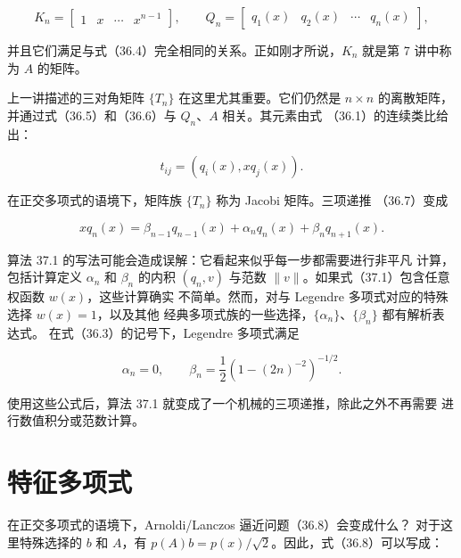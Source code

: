 \documentclass[UTF8,fontset=none,12pt]{ctexart}
\begin{document}
\begin{equation}
K_n=\begin{bmatrix}1&x&\cdots&x^{n-1}\end{bmatrix},
\qquad
Q_n=\begin{bmatrix}q_1(x)&q_2(x)&\cdots&q_n(x)\end{bmatrix},
\tag{37.3}
\end{equation}

并且它们满足与式（36.4）完全相同的关系。正如刚才所说，$K_n$ 就是第 7
讲中称为 $A$ 的矩阵。

上一讲描述的三对角矩阵 $\{T_n\}$ 在这里尤其重要。它们仍然是 $n\times n$
的离散矩阵，并通过式（36.5）和（36.6）与 $Q_n$、$A$ 相关。其元素由式
（36.1）的连续类比给出：

\begin{equation}
t_{ij}=(q_i(x),xq_j(x)).
\tag{37.4}
\end{equation}

在正交多项式的语境下，矩阵族 $\{T_n\}$ 称为 Jacobi 矩阵。三项递推
（36.7）变成

\begin{equation}
xq_n(x)=\beta_{n-1}q_{n-1}(x)+\alpha_nq_n(x)+\beta_nq_{n+1}(x).
\tag{37.5}
\end{equation}

算法 37.1 的写法可能会造成误解：它看起来似乎每一步都需要进行非平凡
计算，包括计算定义 $\alpha_n$ 和 $\beta_n$ 的内积 $(q_n,v)$ 与范数
$\lVert v\rVert$。如果式（37.1）包含任意权函数 $w(x)$，这些计算确实
不简单。然而，对与 Legendre 多项式对应的特殊选择 $w(x)=1$，以及其他
经典多项式族的一些选择，$\{\alpha_n\}$、$\{\beta_n\}$ 都有解析表达式。
在式（36.3）的记号下，Legendre 多项式满足

\begin{equation}
\alpha_n=0,\qquad
\beta_n=\frac{1}{2}\left(1-(2n)^{-2}\right)^{-1/2}.
\tag{37.6}
\end{equation}

使用这些公式后，算法 37.1 就变成了一个机械的三项递推，除此之外不再需要
进行数值积分或范数计算。

\section*{特征多项式}

在正交多项式的语境下，Arnoldi/Lanczos 逼近问题（36.8）会变成什么？
对于这里特殊选择的 $b$ 和 $A$，有
$p(A)b=p(x)/\sqrt{2}$。因此，式（36.8）可以写成：

\begin{center}
\end{center}
\end{document}
